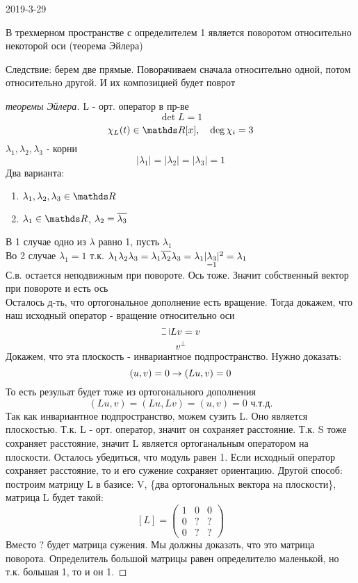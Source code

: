 \documentclass[12pt, fleqn]{article}
\begin{document}
\begin{lect}{2019-3-29}
  \begin{utv}
    В трехмерном пространстве с определителем 1 является поворотом относительно некоторой оси (теорема Эйлера)
  \end{utv}

  Следствие: берем две прямые. Поворачиваем сначала относительно одной, потом относительно другой. И их композицией будет поврот

  \begin{proof}[теоремы Эйлера]
    L - орт. оператор в пр-ве
    \[\det L = 1\]
    \[\chi_L(t) \in \R[x],\q \deg \chi_i = 3\]
    $\lambda_1, \lambda_2, \lambda_3$ - корни
    \[|\lambda_1| = |\lambda_2| = |\lambda_3| = 1\]
    Два варианта:
    \begin{enumerate}
      \item $\lambda_1, \lambda_2, \lambda_3 \in \R$
      \item $\lambda_1 \in \R$, $\lambda_2 = \overline{\lambda_3}$
    \end{enumerate}
    В 1 случае одно из $\lambda$ равно 1, пусть $\lambda_1$\\
    Во 2 случае $\lambda_1 = 1$ т.к. $\lambda_1 \lambda_2 \lambda_3 = \lambda_1 \overline{\lambda_2} \lambda_3 = \lambda_1 |\underset{=1}{\lambda_3}|^2 = \lambda_1$\\
    С.в. остается неподвижным при повороте. Ось тоже. Значит собственный вектор  при повороте и есть ось\\
    Осталось д-ть, что ортогональное дополнение есть вращение. Тогда докажем, что наш исходный оператор - вращение относительно оси
    \[\letus Lv = v\]
    \[v^{\bot}\]
    Докажем, что эта плоскость - инвариантное подпространство. Нужно доказать:
    \[(u,v) = 0 \rightarrow (Lu, v) = 0\]
    То есть резульат будет тоже из ортогонального дополнения
    \[(Lu,v) = (Lu, Lv) = (u,v) = 0 \text{ ч.т.д.}\]
    Так как инвариантное подпространство, можем сузить L. Оно является плоскостью. Т.к. L - орт. оператор, значит он сохраняет расстояние. Т.к. S тоже сохраняет расстояние, значит L является ортоганальным оператором на плоскости. Осталось убедиться, что модуль равен 1. Если исходный оператор сохраняет расстояние, то и его сужение сохраняет ориентацию. Другой способ: построим матрицу L в базисе: V, \{два ортогональных вектора на плоскости\}, матрица L будет такой:\\
    \[[L] = \begin{pmatrix}
      1 & 0 & 0\\
      0 & ? & ?\\
      0 & ? & ?
    \end{pmatrix}\]
    Вместо ? будет матрица сужения. Мы должны доказать, что это матрица поворота. Определитель большой матрицы равен определителю маленькой, но т.к. большая 1, то и он 1.


\end{proof}
\end{lect}
\end{document}
